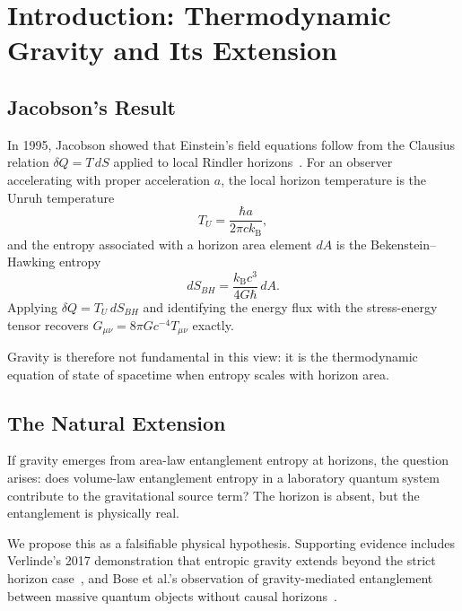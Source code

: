 \documentclass[12pt,letterpaper]{article}
\theoremstyle{plain}
\theoremstyle{definition}
\theoremstyle{remark}
\newcommand{\kB}{k_{\mathrm{B}}}
\begin{document}
\tableofcontents
\bigskip

\section{Introduction: Thermodynamic Gravity and Its Extension}
\label{sec:intro}

\subsection{Jacobson's Result}

In 1995, Jacobson showed that Einstein's field equations follow from the Clausius relation
$\delta Q = T\,dS$ applied to local Rindler horizons~\cite{Jacobson1995}.  For an observer
accelerating with proper acceleration $a$, the local horizon temperature is the Unruh
temperature
\begin{equation}
  T_{U} = \frac{\hbar a}{2\pi c\kB},
  \label{eq:unruh}
\end{equation}
and the entropy associated with a horizon area element $dA$ is the Bekenstein--Hawking entropy
\begin{equation}
  dS_{BH} = \frac{\kB c^{3}}{4G\hbar}\,dA.
  \label{eq:bh-entropy}
\end{equation}
Applying $\delta Q = T_{U}\,dS_{BH}$ and identifying the energy flux with the
stress-energy tensor recovers $G_{\mu\nu} = 8\pi G c^{-4} T_{\mu\nu}$ exactly.

Gravity is therefore not fundamental in this view: it is the thermodynamic equation of state
of spacetime when entropy scales with horizon area.

\subsection{The Natural Extension}

If gravity emerges from area-law entanglement entropy at horizons, the question arises: does
volume-law entanglement entropy in a laboratory quantum system contribute to the gravitational
source term?  The horizon is absent, but the entanglement is physically real.

We propose this as a falsifiable physical hypothesis.  Supporting evidence includes
Verlinde's 2017 demonstration that entropic gravity extends beyond the strict horizon
case~\cite{Verlinde2017}, and Bose et al.'s observation of gravity-mediated entanglement
between massive quantum objects without causal horizons~\cite{Bose2017}.
\end{document}
